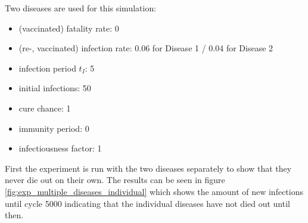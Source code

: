Two diseases are used for this simulation:
\begin{itemize}
    \item (vaccinated) fatality rate: 0
    \item (re-, vaccinated) infection rate: 0.06 for Disease 1 / 0.04 for Disease 2
    \item infection period $t_I$: 5
    \item initial infections: 50
    \item cure chance: 1
    \item immunity period: 0
    \item infectiousness factor: 1
\end{itemize}

First the experiment is run with the two diseases separately to show that they never die out on their own. The results can be seen in figure \ref{fig:exp_multiple_diseases_individual} which shows the amount of new infections until cycle 5000 indicating that the individual diseases have not died out until then.

